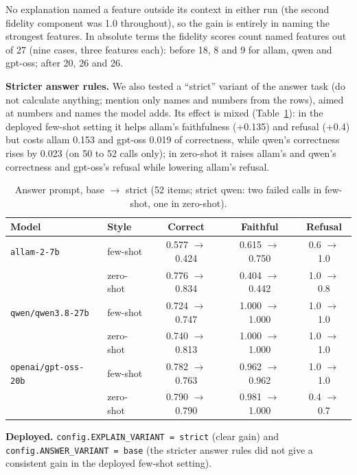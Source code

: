 \documentclass[10pt,a4paper]{article}
\newcommand{\code}[1]{\texttt{#1}}
\begin{document}
No explanation named a feature outside its context in either run (the second fidelity component was 1.0 throughout), so the gain is entirely in naming the strongest features. In absolute terms the fidelity scores count named features out of 27 (nine cases, three features each): before 18, 8 and 9 for allam, qwen and gpt-oss; after 20, 26 and 26.

\textbf{Stricter answer rules.} We also tested a ``strict'' variant of the answer task (do not calculate anything; mention only names and numbers from the rows), aimed at numbers and names the model adds. Its effect is mixed (Table~\ref{tab:strict}): in the deployed few-shot setting it helps allam's faithfulness (+0.135) and refusal (+0.4) but costs allam 0.153 and gpt-oss 0.019 of correctness, while qwen's correctness rises by 0.023 (on 50 to 52 calls only); in zero-shot it raises allam's and qwen's correctness and gpt-oss's refusal while lowering allam's refusal.

\begin{table}[H]
\centering\small
\caption{Answer prompt, base $\rightarrow$ strict (52 items; strict qwen: two failed calls in few-shot, one in zero-shot).}\label{tab:strict}
\begin{tabular}{llccc}
\toprule
Model & Style & Correct & Faithful & Refusal \\
\midrule
\code{allam-2-7b} & few-shot & 0.577 $\rightarrow$ 0.424 & 0.615 $\rightarrow$ 0.750 & 0.6 $\rightarrow$ 1.0 \\
 & zero-shot & 0.776 $\rightarrow$ 0.834 & 0.404 $\rightarrow$ 0.442 & 1.0 $\rightarrow$ 0.8 \\
\code{qwen/qwen3.8-27b} & few-shot & 0.724 $\rightarrow$ 0.747 & 1.000 $\rightarrow$ 1.000 & 1.0 $\rightarrow$ 1.0 \\
 & zero-shot & 0.740 $\rightarrow$ 0.813 & 1.000 $\rightarrow$ 1.000 & 1.0 $\rightarrow$ 1.0 \\
\code{openai/gpt-oss-20b} & few-shot & 0.782 $\rightarrow$ 0.763 & 0.962 $\rightarrow$ 0.962 & 1.0 $\rightarrow$ 1.0 \\
 & zero-shot & 0.790 $\rightarrow$ 0.790 & 0.981 $\rightarrow$ 1.000 & 0.4 $\rightarrow$ 0.7 \\
\bottomrule
\end{tabular}
\end{table}

\textbf{Deployed.} \code{config.EXPLAIN\_VARIANT = strict} (clear gain) and \code{config.ANSWER\_VARIANT = base} (the stricter answer rules did not give a consistent gain in the deployed few-shot setting).
\end{document}
